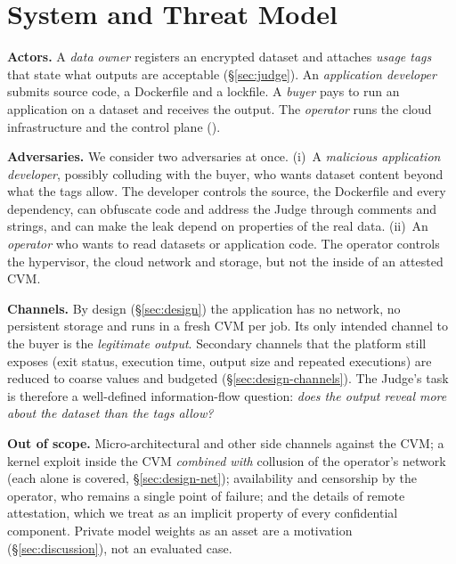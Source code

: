 \section{System and Threat Model}\label{sec:threat}

\textbf{Actors.} A \emph{data owner} registers an encrypted dataset and attaches \emph{usage tags}
that state what outputs are acceptable (\S\ref{sec:judge}). An \emph{application developer}
submits source code, a Dockerfile and a lockfile. A \emph{buyer} pays to run an application on a
dataset and receives the output. The \emph{operator} runs the cloud infrastructure and the
control plane (\sys).

\textbf{Adversaries.} We consider two adversaries at once.
(i)~A \emph{malicious application developer}, possibly colluding with the buyer, who wants
dataset content beyond what the tags allow. The developer controls the source, the Dockerfile and
every dependency, can obfuscate code and address the Judge through comments and strings, and can
make the leak depend on properties of the real data.
(ii)~An \emph{operator} who wants to read datasets or application code. The operator controls the
hypervisor, the cloud network and storage, but not the inside of an attested CVM.

\textbf{Channels.} By design (\S\ref{sec:design}) the application has no network, no persistent
storage and runs in a fresh CVM per job. Its only intended channel to the buyer is the
\emph{legitimate output}. Secondary channels that the platform still exposes (exit status,
execution time, output size and repeated executions) are reduced to coarse values and budgeted
(\S\ref{sec:design-channels}). The Judge's task is therefore a well-defined information-flow
question: \emph{does the output reveal more about the dataset than the tags allow?}

\textbf{Out of scope.} Micro-architectural and other side channels against the CVM; a kernel
exploit inside the CVM \emph{combined with} collusion of the operator's network (each alone is
covered, \S\ref{sec:design-net}); availability and censorship by the operator, who remains a
single point of failure; and the details of remote attestation, which we treat as an implicit
property of every confidential component. Private model weights as an asset are a motivation
(\S\ref{sec:discussion}), not an evaluated case.
